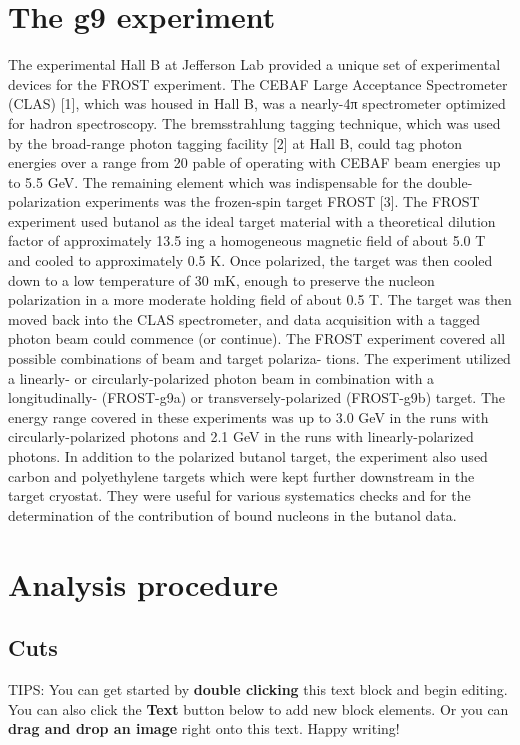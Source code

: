
\tableofcontents

\section{The g9 experiment}
The experimental Hall B at Jefferson Lab provided a unique set of experimental devices for the
FROST experiment. The CEBAF Large Acceptance Spectrometer (CLAS) [1], which was housed
in Hall B, was a nearly-4π spectrometer optimized for hadron spectroscopy. The bremsstrahlung
tagging technique, which was used by the broad-range photon tagging facility [2] at Hall B, could
tag photon energies over a range from 20 %
pable of operating with CEBAF beam energies up to 5.5 GeV. The remaining element which was
indispensable for the double-polarization experiments was the frozen-spin target FROST [3]. The
FROST experiment used butanol as the ideal target material with a theoretical dilution factor of
approximately 13.5 %
ing a homogeneous magnetic field of about 5.0 T and cooled to approximately 0.5 K. Once polarized,
the target was then cooled down to a low temperature of 30 mK, enough to preserve the nucleon
polarization in a more moderate holding field of about 0.5 T. The target was then moved back
into the CLAS spectrometer, and data acquisition with a tagged photon beam could commence (or
continue). The FROST experiment covered all possible combinations of beam and target polariza-
tions. The experiment utilized a linearly- or circularly-polarized photon beam in combination with
a longitudinally- (FROST-g9a) or transversely-polarized (FROST-g9b) target. The energy range
covered in these experiments was up to 3.0 GeV in the runs with circularly-polarized photons and
2.1 GeV in the runs with linearly-polarized photons. In addition to the polarized butanol target,
the experiment also used carbon and polyethylene targets which were kept further downstream in
the target cryostat. They were useful for various systematics checks and for the determination of
the contribution of bound nucleons in the butanol data.

\section{Analysis procedure}
\subsection{Cuts}



TIPS:
You can get started by \textbf{double clicking} this text block and begin editing. You can also click the \textbf{Text} button below to add new block elements. Or you can \textbf{drag and drop an image} right onto this text. Happy writing!
